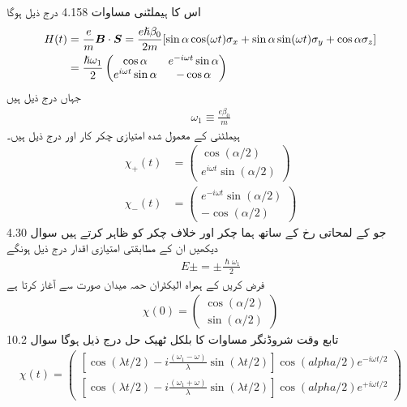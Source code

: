 اس کا ہيملٹنی مساوات 4.158 درج ذیل ہوگا 
\begin{gather}
\begin{aligned}
H(t) &= \frac{e}{m} {{\boldsymbol{B}}} \cdot {\ensuremath{{\boldsymbol{S}}}} = \frac{e \hslash \beta_0}{2m} [\sin \alpha \cos(\omega t) \sigma_x + \sin \alpha \sin(\omega t) \sigma_y + \cos \alpha \sigma_z] \\
&= \frac{\hslash \omega_1}{2}
\begin{pmatrix}
\cos \alpha& e^{-i\omega t}\sin \alpha\\
e^{i\omega t}\sin\alpha& -\cos\alpha
\end{pmatrix} 
\end{aligned}
\end{gather}
جہاں  درج ذیل ہیں 
\begin{align}
\omega_1 \equiv \frac{e \beta_0}{m}
\end{align}
ہيملٹنی  کے معمول شدہ امتیازی چکر کار   اور  درج ذیل ہیں۔
\begin{align}
\chi_+ (t) &= 
\begin{pmatrix}
\cos(\alpha/2) \\
e^{i \omega t} \sin(\alpha/2)
\end{pmatrix}\\
\chi_{-} (t) &= 
\begin{pmatrix}
e^{-i \omega t} \sin(\alpha/2) \\
- \cos(\alpha/2)
\end{pmatrix}
\end{align}
جو  کے لمحاتی رخ کے ساتھ ہما چکر اور خلاف چکر کو ظاہر کرتے ہیں سوال 4.30 دیکھیں ان کے مطابقتی امتیازی اقدار درج ذیل ہونگے 
\begin{align}
E \pm = \pm \frac{\hslash \omega_1}{2}
\end{align}
فرض کریں  کے ہمراہ الیکٹران حمہ میدان صورت سے آغاز کرتا ہے 
\begin{align}
\chi (0) = 
\begin{pmatrix} 
\cos(\alpha/2) \\
\sin(\alpha/2)
\end{pmatrix}
\end{align}
تابع وقت شروڈنگر مساوات کا بلکل ٹھیک حل درج ذیل ہوگا سوال 10.2
\begin{align}
\chi (t) = 
\begin{pmatrix}
[\cos(\lambda t/2) - i \frac{(\omega_1 - \omega)}{\lambda} \sin(\lambda t/2)] \cos(alpha/2) e^{- i \omega t/2} \\
[\cos(\lambda t/2) - i \frac{(\omega_1 + \omega)}{\lambda} \sin(\lambda t/2)] \cos(alpha/2) e^{+ i \omega t/2}
\end{pmatrix}
\end{align}

